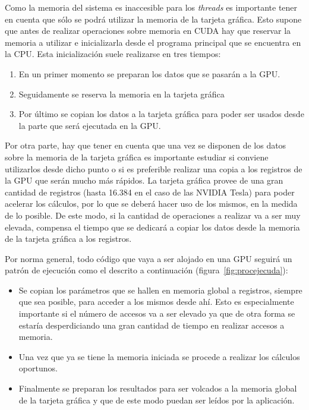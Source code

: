 Como la memoria del sistema es inaccesible para los \emph{threads} es importante tener en cuenta que sólo se podrá utilizar la memoria de la tarjeta gráfica. Esto supone que antes de realizar operaciones sobre memoria en CUDA hay que reservar la memoria a utilizar e inicializarla desde el programa principal que se encuentra en la CPU. Esta inicialización suele realizarse en tres tiempos:

\begin{enumerate}
	\item En un primer momento se preparan los datos que se pasarán a la GPU.

	\item Seguidamente se reserva la memoria en la tarjeta gráfica

	\item Por último se copian los datos a la tarjeta gráfica para poder ser usados desde la parte que será ejecutada en la GPU.
\end{enumerate} 

Por otra parte, hay que tener en cuenta que una vez se disponen de los datos sobre la memoria de la tarjeta gráfica es importante estudiar si conviene utilizarlos desde dicho punto o si es preferible realizar una copia a los registros de la GPU que serán mucho más rápidos. La tarjeta gráfica provee de una gran cantidad de registros (hasta 16.384 en el caso de las NVIDIA Tesla) para poder acelerar los cálculos, por lo que se deberá hacer uso de los mismos, en la medida de lo posible. De este modo, si la cantidad de operaciones a realizar va a ser muy elevada, compensa el tiempo que se dedicará a copiar los datos desde la memoria de la tarjeta gráfica a los registros.

Por norma general, todo código que vaya a ser alojado en una GPU seguirá un patrón de ejecución como el descrito a continuación (figura~\ref{fig:procejecuda}):

\begin{itemize}
	\item Se copian los parámetros que se hallen en memoria global a registros, siempre que sea posible, para acceder a los mismos desde ahí. Esto es especialmente importante si el número de accesos va a ser elevado ya que de otra forma se estaría desperdiciando una gran cantidad de tiempo en realizar accesos a memoria.
	\item Una vez que ya se tiene la memoria iniciada se procede a realizar los cálculos oportunos.
	\item Finalmente se preparan los resultados para ser volcados a la memoria global de la tarjeta gráfica y que de este modo puedan ser leídos por la aplicación.
\end{itemize}

